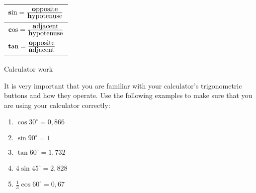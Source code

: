 \begin{table}[H]
\begin{center}
\label{m39408*id79953}
\noindent

\begin{tabular}{|l|}\hline

$\mbox{\textbf{s}in}=\frac{\mbox{\textbf{o}pposite}}{\mbox{\textbf{h}ypotenuse}} $

\\  \hline

$\mbox{\textbf{c}os}=\frac{\mbox{\textbf{a}djacent}}{\mbox{\textbf{h}ypotenuse}} $

\\ \hline

$\mbox{\textbf{t}an}=\frac{\mbox{\textbf{o}pposite}}{\mbox{\textbf{a}djacent}} $

\\   \hline
\end{tabular}
\end{center}
\end{table}
\par


\begin{activity}{Calculator work}

It is very important that you are familiar with your calculator's trigonometric buttons and how they operate.
Use the following examples to make sure that you are using your calculator correctly:
\begin{enumerate}[noitemsep, label=\textbf{\arabic*}. ] 
\item $\cos 30^{\circ} = 0,866$
\item $\sin 90^{\circ} = 1$
\item $\tan 60^{\circ} = 1,732$
\item $4 \sin 45^{\circ} = 2,828$
\item $\frac{1}{3} \cos 60^{\circ} = 0,67$
\end{enumerate}

\end{activity}

